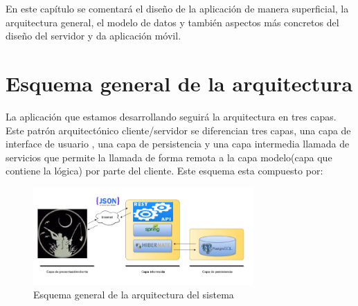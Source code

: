 

En este capítulo se comentará el diseño de la aplicación de manera superficial, la arquitectura general, el
modelo de datos y también aspectos más concretos del diseño del servidor y da aplicación
móvil.



\section{Esquema general de la arquitectura}
La aplicación que estamos desarrollando seguirá la arquitectura
en tres capas. Este patrón arquitectónico cliente/servidor se diferencian tres
capas, una capa de interface de usuario , una capa de persistencia
y una capa intermedia llamada de servicios que permite la llamada de forma remota a la capa modelo(capa que contiene la lógica) por parte del cliente. Este esquema esta compuesto por:




\begin{figure}[H]
		\centering
		\includegraphics[width=0.75\textwidth] {arquitectura.png}
		\caption{Esquema general de la arquitectura del sistema }
	\end{figure}


